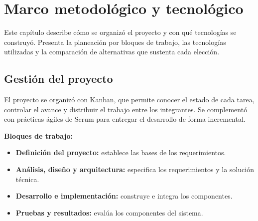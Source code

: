 ﻿\chapter{Marco metodológico y tecnológico}
Este capítulo describe cómo se organizó el proyecto y con qué tecnologías se construyó. Presenta la planeación por bloques de trabajo, las tecnologías utilizadas y la comparación de alternativas que sustenta cada elección.

\section{Gestión del proyecto}
El proyecto se organizó con Kanban, que permite conocer el estado de cada tarea, controlar el avance y distribuir el trabajo entre los integrantes. Se complementó con prácticas ágiles de Scrum para entregar el desarrollo de forma incremental.

\textbf{Bloques de trabajo:} 
\begin{itemize}
    \item \textbf{Definición del proyecto:} establece las bases de los requerimientos.
    \item \textbf{Análisis, diseño y arquitectura:} especifica los requerimientos y la solución técnica.
    \item \textbf{Desarrollo e implementación:} construye e integra los componentes.
    \item \textbf{Pruebas y resultados:} evalúa los componentes del sistema.
\end{itemize}

